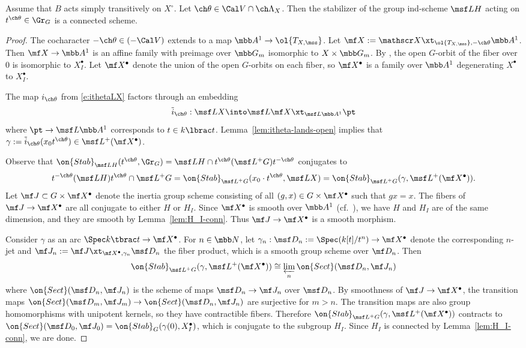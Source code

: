 \begin{cor}
\notready \label{cor:stab-conn}
Assume that $B$ acts simply transitively on $X^\circ$.
Let $\ch\theta \in \Cal V \cap \ch\Lambda_X$.
Then the stabilizer of the group ind-scheme $\msf L H$ acting on $t^{\ch\theta} \in \Gr_G$
is a connected scheme.
\end{cor}
\begin{proof}
The cocharacter $-\ch\theta \in (-\Cal V)$ extends to a map
$\mbb A^1 \to \ol{T_{X,\mss}}$.
Let $\mf X := \mathscr X \xt_{\ol{T_{X,\mss}},-\ch\theta} \mbb A^1$.
Then $\mf X \to \mbb A^1$ is an affine family with preimage over $\mbb G_m$ isomorphic
to $X \times \mbb G_m$. By \cite[Proposition 2.5.3]{SV}, the
open $G$-orbit of the fiber over $0$ is isomorphic to $X_I^\bullet$.
Let $\mf X^\bullet$ denote the union of the open $G$-orbits on each fiber,
so $\mf X^\bullet$ is a family over $\mbb A^1$ degenerating $X^\bullet$ to $X^\bullet_I$.

The map $i_{\ch\theta}$ from \eqref{e:ithetaLX}
factors through an embedding
\[ \tilde i_{\ch\theta}: \msf L X \into \msf L \mf X \xt_{\msf L \mbb A^1} \pt \]
where $\pt \to \msf L \mbb A^1$ corresponds to $t \in k\lbrac t$.
Lemma~\ref{lem:itheta-lands-open} implies that
$\gamma := \tilde i_{\ch\theta}(x_0 t^{\ch\theta}) \in \msf L^+(\mf X^\bullet)$.

Observe that $\on{Stab}_{\msf L H}(t^{\ch\theta}, \Gr_G) =
\msf L H \cap t^{\ch\theta} (\msf L^+ G) t^{-\ch\theta}$ conjugates to
\[ t^{-\ch\theta} (\msf L H) t^{\ch\theta} \cap \msf L^+G =
\on{Stab}_{\msf L^+G}( x_0 \cdot t^{\ch\theta}, \msf L X ) = \on{Stab}_{\msf L^+G}( \gamma, \msf L^+(\mf X^\bullet) ).
\]
Let $\mf J \subset G \times \mf X^\bullet$ denote the inertia group scheme
consisting of all $(g,x) \in G \times \mf X^\bullet$ such that $g x = x$.
The fibers of $\mf J \to \mf X^\bullet$ are all conjugate to either $H$ or $H_I$.
Since $\mf X^\bullet$ is smooth over $\mbb A^1$ (cf.~\cite[Corollary 5.2.3]{GN}),
we have $H$ and $H_I$ are of the same dimension,
and they are smooth by Lemma~\ref{lem:H_I-conn}.
Thus $\mf J \to \mf X^\bullet$ is a smooth morphism.

Consider $\gamma$ as an arc $\Spec k\tbrac t \to \mf X^\bullet$.
For $n\in \mbb N$, let $\gamma_n : \msf D_n := \Spec (k[t]/t^n) \to \mf X^\bullet$ denote the
corresponding $n$-jet and $\mf J_n := \mf J \xt_{\mf X^\bullet,\gamma_n} \msf D_n$ the
fiber product, which is a smooth group scheme over $\mf D_n$.
Then
\[ \on{Stab}_{\msf L^+G}( \gamma, \msf L^+(\mf X^\bullet) ) \cong
\varprojlim_n \on{Sect}( \msf D_n, \mf J_n)
\]
where $\on{Sect}( \msf D_n, \mf J_n)$
is the scheme of maps $\msf D_n \to \mf J_n$ over $\msf D_n$.
By smoothness of $\mf J \to \mf X^\bullet$, the
transition maps $\on{Sect}( \msf D_m, \mf J_m) \to \on{Sect}( \msf D_n, \mf J_n)$
are surjective for $m > n$.
The transition maps are also group homomorphisms with unipotent kernels, so they
have contractible fibers. Therefore
$\on{Stab}_{\msf L^+G}(\gamma, \msf L^+(\mf X^\bullet))$ contracts to
$\on{Sect}(\msf D_0, \mf J_0) = \on{Stab}_G(\gamma(0), X_I^\bullet)$, which is conjugate
to the subgroup $H_I$. Since $H_I$ is connected by Lemma~\ref{lem:H_I-conn}, we are done.
\end{proof}
